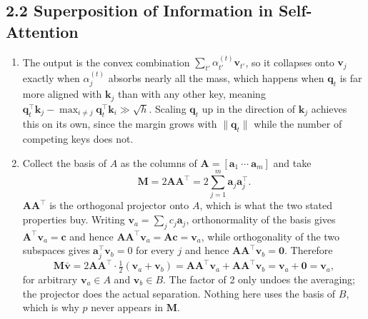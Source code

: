 \documentclass[11pt]{article}
\begin{document}
\subsection*{2.2 Superposition of Information in Self-Attention}

\begin{enumerate}
  \item The output is the convex combination $\sum_{t'} \alpha^{(t)}_{t'} \mathbf{v}_{t'}$, so it collapses onto
        $\mathbf{v}_j$ exactly when $\alpha^{(t)}_j$ absorbs nearly all the mass, which happens when
        $\mathbf{q}_t$ is far more aligned with $\mathbf{k}_j$ than with any other key, meaning
        $\mathbf{q}_t^{\top}\mathbf{k}_j - \max_{i \neq j} \mathbf{q}_t^{\top}\mathbf{k}_i \gg \sqrt{h}$.
        Scaling $\mathbf{q}_t$ up in the direction of $\mathbf{k}_j$ achieves this on its own, since the margin
        grows with $\|\mathbf{q}_t\|$ while the number of competing keys does not.

  \item Collect the basis of $A$ as the columns of $\mathbf{A} = [\mathbf{a}_1 \ \cdots \ \mathbf{a}_m]$ and take
        \[
          \mathbf{M} = 2\mathbf{A}\mathbf{A}^{\top} = 2\sum_{j=1}^{m} \mathbf{a}_j \mathbf{a}_j^{\top}.
        \]
        $\mathbf{A}\mathbf{A}^{\top}$ is the orthogonal projector onto $A$, which is what the two stated
        properties buy. Writing $\mathbf{v}_a = \sum_j c_j \mathbf{a}_j$, orthonormality of the basis gives
        $\mathbf{A}^{\top}\mathbf{v}_a = \mathbf{c}$ and hence
        $\mathbf{A}\mathbf{A}^{\top}\mathbf{v}_a = \mathbf{A}\mathbf{c} = \mathbf{v}_a$, while orthogonality of
        the two subspaces gives $\mathbf{a}_j^{\top}\mathbf{v}_b = 0$ for every $j$ and hence
        $\mathbf{A}\mathbf{A}^{\top}\mathbf{v}_b = \mathbf{0}$. Therefore
        \[
          \mathbf{M}\bar{\mathbf{v}}
          = 2\mathbf{A}\mathbf{A}^{\top}\cdot \tfrac{1}{2}(\mathbf{v}_a + \mathbf{v}_b)
          = \mathbf{A}\mathbf{A}^{\top}\mathbf{v}_a + \mathbf{A}\mathbf{A}^{\top}\mathbf{v}_b
          = \mathbf{v}_a + \mathbf{0} = \mathbf{v}_a,
        \]
        for arbitrary $\mathbf{v}_a \in A$ and $\mathbf{v}_b \in B$. The factor of 2 only undoes the averaging;
        the projector does the actual separation. Nothing here uses the basis of $B$, which is why $p$ never
        appears in $\mathbf{M}$.


\end{enumerate}
\end{document}
